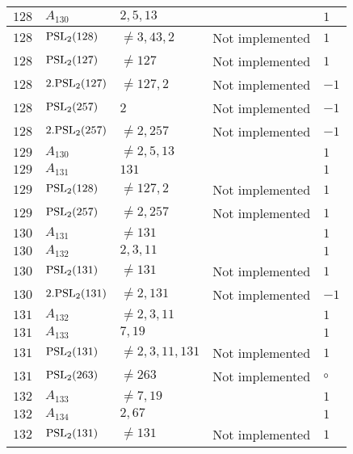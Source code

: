 \documentclass[a4paper, 11pt]{article}
\begin{document}
\begin{longtable}{lllll}
        $ 128 $ & $ A_{130} $ & $ 2, 5, 13 $ & $ ~ $ & $ 1  $ \\ \hline
        $ 128 $ & $ {\rm PSL}_{2}(128) $ & $ \neq 3, 43, 2 $ & Not implemented & $ 1  $ \\ \hline
        $ 128 $ & $ {\rm PSL}_{2}(127) $ & $ \neq 127 $ & Not implemented & $ 1  $ \\ \hline
        $ 128 $ & $ 2.{\rm PSL}_{2}(127) $ & $ \neq 127, 2 $ & Not implemented & $ -1  $ \\ \hline
        $ 128 $ & $ {\rm PSL}_{2}(257) $ & $ 2 $ & Not implemented & $ -1  $ \\ \hline
        $ 128 $ & $ 2.{\rm PSL}_{2}(257) $ & $ \neq 2, 257 $ & Not implemented & $ -1  $ \\ \hline
        $ 129 $ & $ A_{130} $ & $ \neq 2, 5, 13 $ & $ ~ $ & $ 1  $ \\ \hline
        $ 129 $ & $ A_{131} $ & $ 131 $ & $ ~ $ & $ 1  $ \\ \hline
        $ 129 $ & $ {\rm PSL}_{2}(128) $ & $ \neq 127, 2 $ & Not implemented & $ 1  $ \\ \hline
        $ 129 $ & $ {\rm PSL}_{2}(257) $ & $ \neq 2, 257 $ & Not implemented & $ 1  $ \\ \hline
        $ 130 $ & $ A_{131} $ & $ \neq 131 $ & $ ~ $ & $ 1  $ \\ \hline
        $ 130 $ & $ A_{132} $ & $ 2, 3, 11 $ & $ ~ $ & $ 1  $ \\ \hline
        $ 130 $ & $ {\rm PSL}_{2}(131) $ & $ \neq 131 $ & Not implemented & $ 1  $ \\ \hline
        $ 130 $ & $ 2.{\rm PSL}_{2}(131) $ & $ \neq 2, 131 $ & Not implemented & $ -1  $ \\ \hline
        $ 131 $ & $ A_{132} $ & $ \neq 2, 3, 11 $ & $ ~ $ & $ 1  $ \\ \hline
        $ 131 $ & $ A_{133} $ & $ 7, 19 $ & $ ~ $ & $ 1  $ \\ \hline
        $ 131 $ & $ {\rm PSL}_{2}(131) $ & $ \neq 2, 3, 11, 131 $ & Not implemented & $ 1  $ \\ \hline
        $ 131 $ & $ {\rm PSL}_{2}(263) $ & $ \neq 263 $ & Not implemented & $\circ$ \\ \hline
        $ 132 $ & $ A_{133} $ & $ \neq 7, 19 $ & $ ~ $ & $ 1  $ \\ \hline
        $ 132 $ & $ A_{134} $ & $ 2, 67 $ & $ ~ $ & $ 1  $ \\ \hline
        $ 132 $ & $ {\rm PSL}_{2}(131) $ & $ \neq 131 $ & Not implemented & $ 1  $ \\ \hline

\end{longtable}
\end{document}
